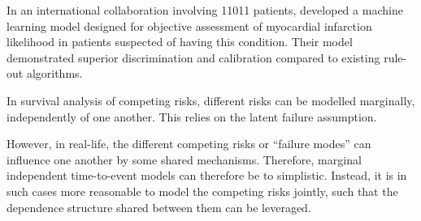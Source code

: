 In an international collaboration involving \num{11011} patients, 
\citeauthor{thanMachine2019} developed a machine learning model 
designed for objective assessment of myocardial infarction likelihood 
in patients suspected of having this condition. 
Their model demonstrated superior discrimination and calibration 
compared to existing rule-out algorithms.
~\autocite{thanMachine2019}

In survival analysis of competing risks, 
different risks can be modelled marginally,
independently of one another.
This relies on the latent failure assumption.

However, in real-life, the different competing risks 
or \enquote{failure modes} can influence one another
by some shared mechanisms.
Therefore, marginal independent time-to-event models
can therefore be to simplistic.
Instead, it is in such cases
more reasonable to model the competing risks jointly,
such that the dependence structure shared between them
can be leveraged.

